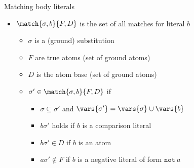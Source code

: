 \begin{frame}{Matching body literals}
  \bigskip
  \begin{itemize}
    \item<4-> \(\match{\sigma,b}{F,D}\) is the set of \alert{all matches for literal} \(b\)
      \begin{itemize}\normalsize
        \item \(\sigma\) is a (ground) substitution
        \item \(F\) are true atoms (set of ground atoms)
        \item \(D\) is the atom base (set of ground atoms)
              \medskip
        \item<5-8> \(\sigma' \in \match{\sigma,b}{F,D}\) if%
          \begin{itemize}\normalsize
            \item \(\sigma \subseteq \sigma'\) and \(\vars{\sigma'} = \vars{\sigma} \cup \vars{b}\)
                  \smallskip
            \item \(b\sigma'\) holds if \(b\) is a comparison literal
            \item \(b\sigma' \in D\) if \(b\) is an atom
            \item \(a\sigma' \not\in F\) if \(b\) is a negative literal of form \(\texttt{not}\ a\)
          \end{itemize}
      \end{itemize}
  \end{itemize}
\end{frame}
